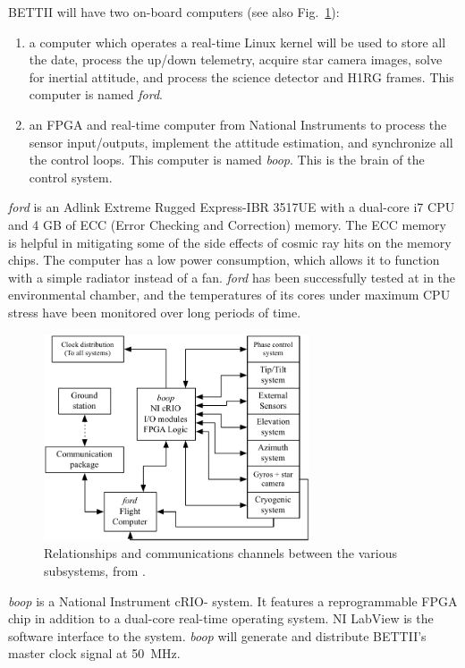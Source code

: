 BETTII will have two on-board computers (see also Fig.~\ref{fig:FlowDiagram}): 
\begin{enumerate}
\item a computer which operates a real-time Linux kernel will be used to store all the date, process the up/down telemetry, acquire star camera images, solve for inertial attitude, and process the science detector and H1RG frames. This computer is named \textit{ford}.
\item an FPGA and real-time computer from National Instruments to process the sensor input/outputs, implement the attitude estimation, and synchronize all the control loops. This computer is named \textit{boop}. This is the brain of the control system. 
\end{enumerate}



\textit{ford} is an Adlink Extreme Rugged Express-IBR 3517UE with a dual-core i7 CPU and 4 GB of ECC (Error Checking and Correction) memory. The ECC memory is helpful in mitigating some of the side effects of cosmic ray hits on the memory chips. The computer has a low power consumption, which allows it to function with a simple radiator instead of a fan. 
\textit{ford} has been successfully tested at in the environmental chamber, and the temperatures of its cores under maximum CPU stress have been monitored over long periods of time. 


\begin{figure}[!h]
		\centering
		\includegraphics[width=0.7\textwidth]{Figures/FlowDiagram.pdf} 
		\caption[Flow diagram]{Relationships and communications channels between the various subsystems, from \citet{Rizzo:2014jq}.}
		\label{fig:FlowDiagram}
\end{figure}

\textit{boop} is a National Instrument cRIO- system. It features a reprogrammable FPGA chip in addition to a dual-core real-time operating system. NI LabView is the software interface to the system. \textit{boop} will generate and distribute BETTII's master clock signal at \SI{50}{\mega\hertz}.


